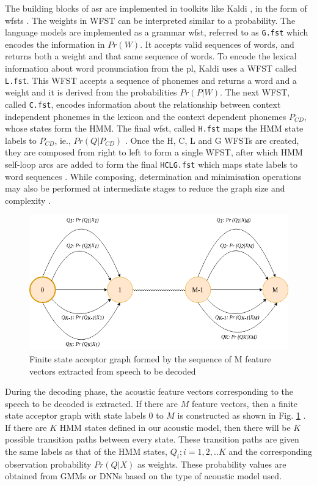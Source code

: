 The building blocks of \gls{asr} are implemented in toolkits like Kaldi
\cite{povey2011kaldi}, in the form of \gls{wfst}s \cite{mohri-1997-finite}.
The weights in WFST can be interpreted similar to a probability. The language
models are implemented as a grammar \gls{wfst}, referred to as \texttt{G.fst} which encodes the information in $Pr(W)$.
It accepts valid sequences of words, and returns both a weight and that same
sequence of words. To encode the lexical information about word pronunciation from the
\gls{pl}, Kaldi uses a WFST called \texttt{L.fst}. This WFST accepts a sequence
of phonemes and returns a word and a weight and it is derived from the probabilities $Pr(P|W)$. The next WFST, called
\texttt{C.fst}, encodes information about the relationship between  context independent phonemes in
the lexicon and the context dependent phonemes $P_{CD}$, whose states form the HMM. The final \gls{wfst}, called
\texttt{H.fst} maps the HMM state labels to $P_{CD}$, ie., $Pr(Q|P_{CD})$
\cite{meyer2019multi}. Once the H, C, L and G WFSTs are created, they are
composed from right to left to form a single WFST, after which HMM self-loop
arcs are added to form the final \texttt{HCLG.fst} which maps state
labels to word sequences \cite{madhavaraj2020strategies,povey2012generating}. While composing,
determination and minimisation operations may also be  performed  at
intermediate stages to reduce the graph size and complexity
\cite{madhavaraj2020strategies}.
\begin{figure}[htpb]
	\begin{center}
		\includegraphics[width=0.8\linewidth]{acceptor.png}
		\caption{Finite state acceptor graph formed by the sequence of M feature vectors extracted from speech to be decoded}
		\label{fig:feature-fsa}
	\end{center}
\end{figure}


During the decoding phase, the acoustic feature vectors corresponding to the speech to be decoded is extracted.  If there are $M$ feature vectors, then a finite state acceptor graph with state labels $0$ to $M$ is constructed as shown in Fig. \ref{fig:feature-fsa} \cite{povey2012generating}. If there are $K$ HMM states defined in our acoustic model, then there will be $K$ possible transition paths between every state. These transition paths are given the same labels as that of the HMM states, $Q_i ; i= 1,2,..K$ and the corresponding observation probability $Pr(Q|X)$ as weights. These probability values  are obtained from GMMs or DNNs based on the type of acoustic model used. 

